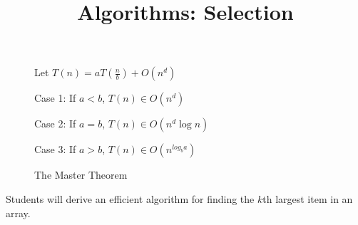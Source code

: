 \documentclass{tufte-handout}
\title{Algorithms: Selection}
\date{}
\begin{document}
\maketitle
\begin{figure}
\caption{The Master Theorem}
Let $T(n) = a T(\frac{n}{b}) + O(n^d)$ 

Case 1: If $a < b$, $T(n) \in O(n^d)$

Case 2: If $a = b$, $T(n) \in O(n^d \log n)$

Case 3: If $a > b$, $T(n) \in O(n^{log_b a})$
\end{figure}

\begin{objective}
  Students will derive an efficient algorithm for finding the $k$th largest item in an array.
\end{objective}
\end{document}
